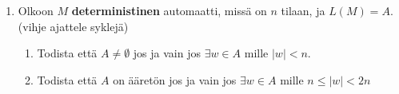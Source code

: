 \documentclass[finnish]{article}
\newcommand{\set}[1]{{\left\{ #1 \right\}}}
\begin{document}
\begin{enumerate}
\item 
Olkoon $M$ \textbf{deterministinen} automaatti, missä on $n$ tilaan, ja $L(M)=A$. (vihje ajattele syklejä)
\begin{enumerate}
\item Todista että $A\neq \emptyset$ jos ja vain jos $\exists w \in A$ mille $|w| < n$.
\item
Todista että $A$ on ääretön jos ja vain jos $\exists w \in A$ mille $n \le |w| < 2n$
\end{enumerate}




%



\end{enumerate}
\end{document}
